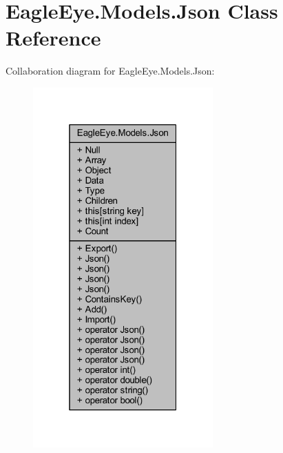 \hypertarget{class_eagle_eye_1_1_models_1_1_json}{}\section{Eagle\+Eye.\+Models.\+Json Class Reference}
\label{class_eagle_eye_1_1_models_1_1_json}


 




Collaboration diagram for Eagle\+Eye.\+Models.\+Json\+:\nopagebreak
\begin{figure}[H]
\begin{center}
\leavevmode
\includegraphics[width=196pt]{class_eagle_eye_1_1_models_1_1_json__coll__graph}
\end{center}
\end{figure}
